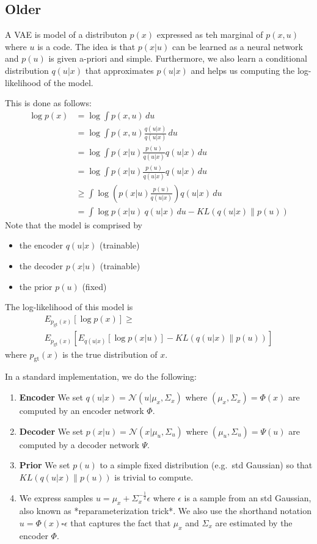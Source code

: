 \subsection{Older}

A VAE is model of a distributon $p(x)$ expressed as teh marginal of $p(x,u)$ where $u$ is a code.
The idea is that $p(x|u)$ can be learned as a neural network and $p(u)$ is given a-priori and simple.
Furthermore, we also learn a conditional distribution $q(u|x)$ that approximates $p(u|x)$ and helps us computing the log-likelihood of the model.

This is done as follows:
$$
\begin{aligned}
\log p(x)
&= \log \int p(x,u) \,du \\
&= \log \int p(x,u) \frac{q(u|x)}{q(u|x)} \,du \\
&= \log \int p(x|u) \frac{p(u)}{q(u|x)} q(u|x) \,du \\
&= \log \int p(x|u) \frac{p(u)}{q(u|x)} q(u|x) \,du \\
&\geq \int \log \left(p(x|u) \frac{p(u)}{q(u|x)}\right) q(u|x) \,du \\
&=\int \log p(x|u) ~q(u|x) \,du - KL\left(q(u|x) \| p(u)\right)
\end{aligned}
$$
Note that the model is comprised by
\begin{itemize}
\item the encoder $q(u|x)$  (trainable)
\item the decoder $p(x|u)$ (trainable)
\item the prior $p(u)$ (fixed)
\end{itemize}
The log-likelihood of this model is
\begin{multline}
E_{p_{\text{gt}}(x)}[
  \log p(x)
]
\geq \\
E_{p_{\text{gt}}(x)}
\left[
E_{q(u|x)}[
  \log p(x|u)
]
-
KL\left(q(u|x) \| p(u)\right)
\right]
\end{multline}
where $p_{\text{gt}}(x)$ is the true distribution of $x$.

In a standard implementation, we do the following:

\begin{enumerate}
\item \textbf{Encoder} We set $q(u|x) = \mathcal{N}(u | \mu_x, \Sigma_x)$ where $(\mu_x,\Sigma_x) = \Phi(x)$ are computed by an encoder network $\Phi$.
\item \textbf{Decoder} We set $p(x|u) = \mathcal{N}(x | \mu_u, \Sigma_u)$ where $(\mu_u,\Sigma_u) = \Psi(u)$ are computed by a decoder network $\Psi$.
\item \textbf{Prior} We set $p(u)$ to a simple fixed distribution (e.g.~std Gaussian) so that $KL(q(u|x) \| p(u))$ is trivial to compute.
\item We express samples $u = \mu_x + \Sigma_x^{-\frac{1}{2}} \epsilon$ where $\epsilon$ is a sample from an std Gaussian, also known as *reparameterization trick*. We also use the shorthand notation $u = \Phi(x) \square \epsilon$ that captures the fact that $\mu_x$ and $\Sigma_x$ are estimated by the encoder $\Phi$.
\end{enumerate}

